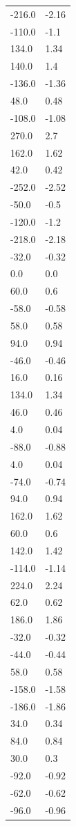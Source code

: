 \begin{longtable}{ll}
-216.0 & -2.16 \\
-110.0 & -1.1 \\
134.0 & 1.34 \\
140.0 & 1.4 \\
-136.0 & -1.36 \\
48.0 & 0.48 \\
-108.0 & -1.08 \\
270.0 & 2.7 \\
162.0 & 1.62 \\
42.0 & 0.42 \\
-252.0 & -2.52 \\
-50.0 & -0.5 \\
-120.0 & -1.2 \\
-218.0 & -2.18 \\
-32.0 & -0.32 \\
0.0 & 0.0 \\
60.0 & 0.6 \\
-58.0 & -0.58 \\
58.0 & 0.58 \\
94.0 & 0.94 \\
-46.0 & -0.46 \\
16.0 & 0.16 \\
134.0 & 1.34 \\
46.0 & 0.46 \\
4.0 & 0.04 \\
-88.0 & -0.88 \\
4.0 & 0.04 \\
-74.0 & -0.74 \\
94.0 & 0.94 \\
162.0 & 1.62 \\
60.0 & 0.6 \\
142.0 & 1.42 \\
-114.0 & -1.14 \\
224.0 & 2.24 \\
62.0 & 0.62 \\
186.0 & 1.86 \\
-32.0 & -0.32 \\
-44.0 & -0.44 \\
58.0 & 0.58 \\
-158.0 & -1.58 \\
-186.0 & -1.86 \\
34.0 & 0.34 \\
84.0 & 0.84 \\
30.0 & 0.3 \\
-92.0 & -0.92 \\
-62.0 & -0.62 \\
-96.0 & -0.96 \\

\end{longtable}
